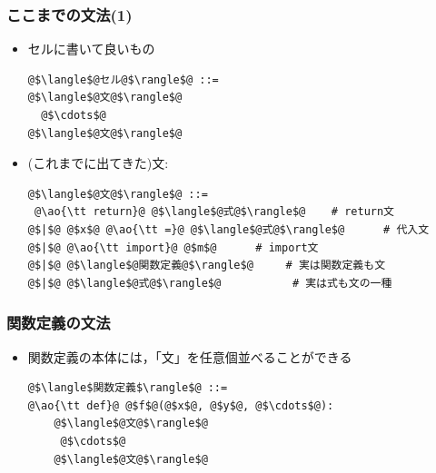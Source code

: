 \documentclass[10pt,dvipdfmx]{beamer}
\newcommand{\ao}[1]{{\color{blue}#1}}
\begin{document}
\begin{frame}[fragile]
\frametitle{ここまでの文法(1)}
\begin{itemize}
\item セルに書いて良いもの
\begin{lstlisting}
@$\langle$@セル@$\rangle$@ ::=
@$\langle$@文@$\rangle$@
  @$\cdots$@
@$\langle$@文@$\rangle$@
\end{lstlisting}
\item (これまでに出てきた)文:
\begin{lstlisting}
@$\langle$@文@$\rangle$@ ::=
 @\ao{\tt return}@ @$\langle$@式@$\rangle$@    # return文
@$|$@ @$x$@ @\ao{\tt =}@ @$\langle$@式@$\rangle$@      # 代入文
@$|$@ @\ao{\tt import}@ @$m$@      # import文
@$|$@ @$\langle$@関数定義@$\rangle$@     # 実は関数定義も文
@$|$@ @$\langle$@式@$\rangle$@           # 実は式も文の一種
\end{lstlisting}
\end{itemize}
\end{frame}

\begin{frame}[fragile]
\frametitle{関数定義の文法}
\begin{itemize}
\item 関数定義の本体には，「文」を任意個並べることができる
\begin{lstlisting}
@$\langle$関数定義$\rangle$@ ::=
@\ao{\tt def}@ @$f$@(@$x$@, @$y$@, @$\cdots$@):
    @$\langle$@文@$\rangle$@
     @$\cdots$@
    @$\langle$@文@$\rangle$@
\end{lstlisting}
\end{itemize}
\end{frame}
\end{document}
